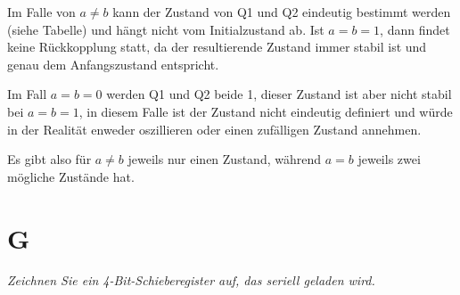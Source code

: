 Im Falle von $a \ne b$ kann der Zustand von Q1 und Q2 eindeutig bestimmt werden (siehe Tabelle) und hängt nicht vom Initialzustand ab. Ist $a=b=1$, dann findet keine Rückkopplung statt, da der resultierende Zustand immer stabil ist und genau dem Anfangszustand entspricht.

Im Fall $a=b=0$ werden Q1 und Q2 beide 1, dieser Zustand ist aber nicht stabil bei $a=b=1$, in diesem Falle ist der Zustand nicht eindeutig definiert und würde in der Realität enweder oszillieren oder einen zufälligen Zustand annehmen.

Es gibt also für $a\ne b$ jeweils nur einen Zustand, während $a=b$ jeweils zwei mögliche Zustände hat.


\section{G}
\textit{Zeichnen Sie ein 4-Bit-Schieberegister auf, das seriell geladen wird.}



